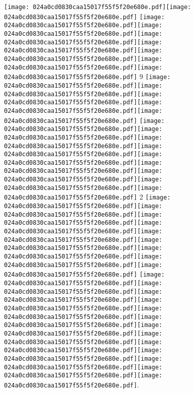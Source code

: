 \documentclass{article}
\newcommand{\origpg}[2]{\texttt{[image: 024a0cd0830caa15017f55f5f20e680e.pdf]}}
\begin{document}
{\fontsize{16.14pt}{19.368pt}\selectfont{}

\vspace*{-19.368pt} \hspace{31.403pt}\origpg{13}{120.74pt 773.51pt 132.39pt 789.65pt}\origpg{13}{132.3pt 773.51pt 139.46pt 789.65pt} \origpg{13}{146.48pt 773.51pt 154.56pt 789.65pt}\origpg{13}{154.65pt 773.51pt 163.29pt 789.65pt}\hspace{-0.21pt}\origpg{13}{163.08pt 773.51pt 170.24pt 789.65pt}\hspace{-0.178pt}\origpg{13}{170.07pt 773.51pt 178.14pt 789.65pt}\hspace{-0.355pt}\origpg{13}{177.78pt 773.51pt 186.42pt 789.65pt}\origpg{13}{186.42pt 773.51pt 194.26pt 789.65pt}\hspace{-0.339pt}\origpg{13}{193.92pt 773.51pt 201.09pt 789.65pt} 9 \origpg{13}{223.02pt 773.51pt 233.24pt 789.65pt}\origpg{13}{233.14pt 773.51pt 241.21pt 789.65pt}\hspace{-0.597pt}\origpg{13}{240.62pt 773.51pt 251.77pt 789.65pt}\origpg{13}{251.7pt 773.51pt 260.34pt 789.65pt}\origpg{13}{260.34pt 773.51pt 268.41pt 789.65pt} \origpg{13}{275.3pt 773.51pt 283.94pt 789.65pt}\origpg{13}{283.94pt 773.51pt 291.1pt 789.65pt}\origpg{13}{291.18pt 773.51pt 299.4pt 789.65pt}\hspace{-0.5pt}\origpg{13}{298.9pt 773.51pt 306.95pt 789.65pt}\origpg{13}{306.85pt 773.51pt 318.91pt 789.65pt}\hspace{-0.742pt}\origpg{13}{318.17pt 773.51pt 326.38pt 789.65pt}\origpg{13}{326.38pt 773.51pt 333.55pt 789.65pt}\hspace{-0.452pt}\origpg{13}{333.1pt 773.51pt 340.15pt 789.65pt}\origpg{13}{340.09pt 773.51pt 347.45pt 789.65pt} 2 \origpg{13}{369.2pt 773.51pt 377.28pt 789.65pt}\origpg{13}{377.37pt 773.51pt 384.54pt 789.65pt}\origpg{13}{384.59pt 773.51pt 390.96pt 789.65pt}\hspace{-0.113pt}\origpg{13}{390.85pt 773.51pt 398.9pt 789.65pt}\origpg{13}{398.81pt 773.51pt 407.44pt 789.65pt}\origpg{13}{407.44pt 773.51pt 415.56pt 789.65pt}\hspace{-0.129pt}\origpg{13}{415.43pt 773.51pt 424.07pt 789.65pt}\origpg{13}{424.07pt 773.51pt 434.91pt 789.65pt}\origpg{13}{434.91pt 773.51pt 442.98pt 789.65pt} \origpg{13}{449.62pt 773.51pt 457.69pt 789.65pt}\origpg{13}{457.78pt 773.51pt 464.95pt 789.65pt}\origpg{13}{465pt 773.51pt 472.16pt 789.65pt}\hspace{-0.178pt}\origpg{13}{471.99pt 773.51pt 480.62pt 789.65pt}\origpg{13}{480.62pt 773.51pt 488.69pt 789.65pt}\hspace{0.145pt}\origpg{13}{488.84pt 773.51pt 496pt 789.65pt}\hspace{-0.42pt}\origpg{13}{495.58pt 773.51pt 503.8pt 789.65pt}\origpg{13}{503.8pt 773.51pt 510.97pt 789.65pt}\hspace{-0.21pt}\origpg{13}{510.76pt 773.51pt 518.81pt 789.65pt}\origpg{13}{518.71pt 773.51pt 525.88pt 789.65pt}\hspace{-0.177pt}\origpg{13}{525.7pt 773.51pt 534.34pt 789.65pt}\origpg{13}{534.34pt 773.51pt 542.97pt 789.65pt}\origpg{13}{543.04pt 773.51pt 550.46pt 789.65pt}. 

}
\end{document}
